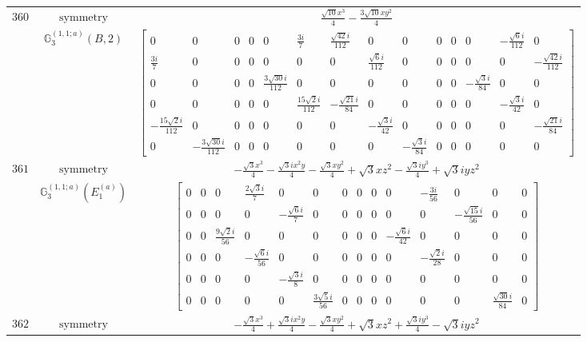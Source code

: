 \documentclass[fleqn,8pt,landscape]{jsarticle}
\begin{document}
\begin{longtable}{ccc}
$ 360 $ & $ \text{symmetry} $ & $ \frac{\sqrt{10} x^{3}}{4} - \frac{3 \sqrt{10} x y^{2}}{4} $ \\
$  $ & $ \mathbb{G}_{3}^{(1,1;a)}(B,2) $ & $ \begin{bmatrix} 0 & 0 & 0 & 0 & 0 & \frac{3 i}{7} & \frac{\sqrt{42} i}{112} & 0 & 0 & 0 & 0 & 0 & - \frac{\sqrt{6} i}{112} & 0 \\ \frac{3 i}{7} & 0 & 0 & 0 & 0 & 0 & 0 & \frac{\sqrt{6} i}{112} & 0 & 0 & 0 & 0 & 0 & - \frac{\sqrt{42} i}{112} \\ 0 & 0 & 0 & 0 & \frac{3 \sqrt{30} i}{112} & 0 & 0 & 0 & 0 & 0 & 0 & - \frac{\sqrt{3} i}{84} & 0 & 0 \\ 0 & 0 & 0 & 0 & 0 & \frac{15 \sqrt{2} i}{112} & - \frac{\sqrt{21} i}{84} & 0 & 0 & 0 & 0 & 0 & - \frac{\sqrt{3} i}{42} & 0 \\ - \frac{15 \sqrt{2} i}{112} & 0 & 0 & 0 & 0 & 0 & 0 & - \frac{\sqrt{3} i}{42} & 0 & 0 & 0 & 0 & 0 & - \frac{\sqrt{21} i}{84} \\ 0 & - \frac{3 \sqrt{30} i}{112} & 0 & 0 & 0 & 0 & 0 & 0 & - \frac{\sqrt{3} i}{84} & 0 & 0 & 0 & 0 & 0 \end{bmatrix} $ \\ \hline
$ 361 $ & $ \text{symmetry} $ & $ - \frac{\sqrt{3} x^{3}}{4} - \frac{\sqrt{3} i x^{2} y}{4} - \frac{\sqrt{3} x y^{2}}{4} + \sqrt{3} x z^{2} - \frac{\sqrt{3} i y^{3}}{4} + \sqrt{3} i y z^{2} $ \\
$  $ & $ \mathbb{G}_{3}^{(1,1;a)}(E_{1}^{(a)}) $ & $ \begin{bmatrix} 0 & 0 & 0 & \frac{2 \sqrt{3} i}{7} & 0 & 0 & 0 & 0 & 0 & 0 & - \frac{3 i}{56} & 0 & 0 & 0 \\ 0 & 0 & 0 & 0 & - \frac{\sqrt{6} i}{7} & 0 & 0 & 0 & 0 & 0 & 0 & - \frac{\sqrt{15} i}{56} & 0 & 0 \\ 0 & 0 & \frac{9 \sqrt{2} i}{56} & 0 & 0 & 0 & 0 & 0 & 0 & - \frac{\sqrt{6} i}{42} & 0 & 0 & 0 & 0 \\ 0 & 0 & 0 & - \frac{\sqrt{6} i}{56} & 0 & 0 & 0 & 0 & 0 & 0 & - \frac{\sqrt{2} i}{28} & 0 & 0 & 0 \\ 0 & 0 & 0 & 0 & - \frac{\sqrt{3} i}{8} & 0 & 0 & 0 & 0 & 0 & 0 & 0 & 0 & 0 \\ 0 & 0 & 0 & 0 & 0 & \frac{3 \sqrt{5} i}{56} & 0 & 0 & 0 & 0 & 0 & 0 & \frac{\sqrt{30} i}{84} & 0 \end{bmatrix} $ \\ \hline
$ 362 $ & $ \text{symmetry} $ & $ - \frac{\sqrt{3} x^{3}}{4} + \frac{\sqrt{3} i x^{2} y}{4} - \frac{\sqrt{3} x y^{2}}{4} + \sqrt{3} x z^{2} + \frac{\sqrt{3} i y^{3}}{4} - \sqrt{3} i y z^{2} $ \\

\end{longtable}
\end{document}
